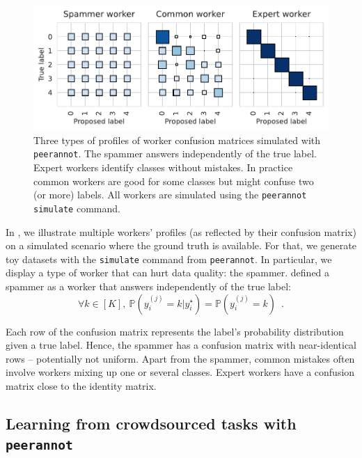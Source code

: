 \begin{figure}[tbh]
    \centering
    \includegraphics[width=\textwidth]{./images_peerannot/fig-confusionmatrix-output-1.pdf}
    \caption{Three types of profiles of worker confusion matrices simulated with \texttt{peerannot}. The spammer answers independently of the true label. Expert workers identify classes without mistakes. In practice common workers are good for some classes but might confuse two (or more) labels. All workers are simulated using the \texttt{peerannot simulate} command. }
    \label{fig:confusionmatrix}
\end{figure}
In ,  we illustrate multiple workers' profiles (as reflected by their confusion matrix) on a simulated scenario where the ground truth is available. For that, we generate toy datasets with the \texttt{simulate} command from \texttt{peerannot}.
In particular, we display a type of worker that can hurt data quality: the spammer.
 defined a spammer as a worker that answers independently of the true label:
\begin{equation}\label{eq:spammer2}
    \forall k\in[K],\ \mathbb{P}(y_i^{(j)}=k|y_i^\star) = \mathbb{P}(y_i^{(j)}=k)\enspace.
\end{equation}

Each row of the confusion matrix represents the label's probability distribution given a true label. Hence, the spammer has a confusion matrix with near-identical rows -- potentially not uniform.
Apart from the spammer, common mistakes often involve workers mixing up one or several classes.
Expert workers have a confusion matrix close to the identity matrix.

\subsection{Learning from crowdsourced tasks with \texttt{peerannot}}
\label{subsec:learning_peerannot}

